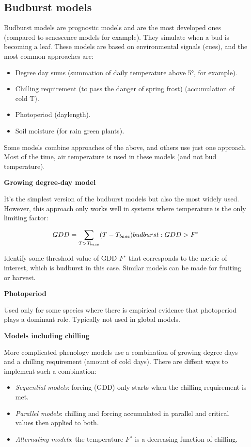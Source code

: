 \documentclass[12pt,oneside]{book}
\providecommand{\tightlist}{%
  \setlength{\itemsep}{0pt}\setlength{\parskip}{0pt}}
\begin{document}
\subsection{Budburst models}\label{budburst-models}

Budburst models are prognostic models and are the most developed ones
(compared to senescence models for example). They simulate when a bud is
becoming a leaf. These models are based on environmental signals (cues),
and the most common approaches are:

\begin{itemize}
\tightlist
\item
  Degree day sums (summation of daily temperature above 5°, for
  example).
\item
  Chilling requirement (to pass the danger of spring frost)
  (accumulation of cold T).
\item
  Photoperiod (daylength).
\item
  Soil moisture (for rain green plants).
\end{itemize}

Some models combine approaches of the above, and others use just one
approach. Most of the time, air temperature is used in these models (and
not bud temperature).

\textbf{Growing degree-day model}

It's the simplest version of the budburst models but also the most
widely used. However, this approach only works well in systems where
temperature is the only limiting factor:

\[
GDD = \sum_{T>T_{base}}(T-T_{base}) \\
budburst:GDD>F^*
\]

Identify some threshold value of GDD \(F^{∗}\) that corresponds to the
metric of interest, which is budburst in this case. Similar models can
be made for fruiting or harvest.

\textbf{Photoperiod}

Used only for some species where there is empirical evidence that
photoperiod plays a dominant role. Typically not used in global models.

\textbf{Models including chilling}

More complicated phenology models use a combination of growing degree
days and a chilling requirement (amount of cold days). There are diffent
ways to implement such a combination:

\begin{itemize}
\item
  \emph{Sequential models}: forcing (GDD) only starts when the chilling
  requirement is met.
\item
  \emph{Parallel models}: chilling and forcing accumulated in parallel
  and critical values then applied to both.
\item
  \emph{Alternating models}: the temperature \(F^∗\) is a decreasing
  function of chilling.
\end{itemize}
\end{document}
